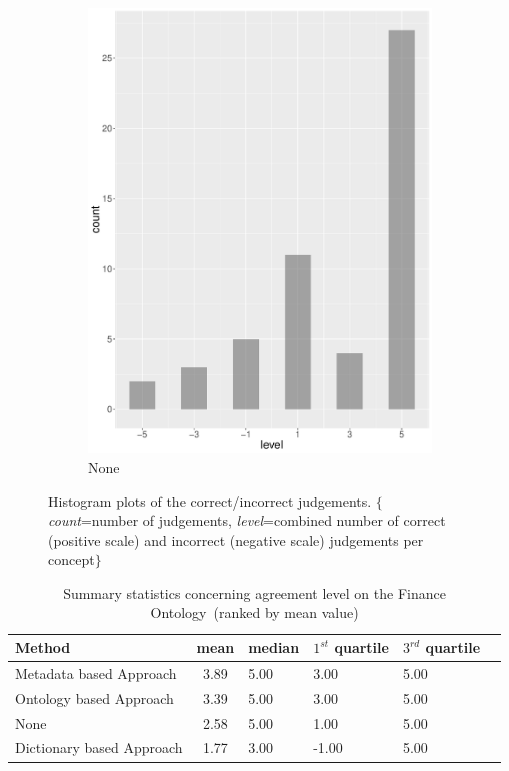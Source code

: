 \begin{figure}
\begin{subfigure}[b]{0.4\textwidth}
        \includegraphics[width=\textwidth]{plots/tennis/hist_level_none}
        \caption{None}
        \label{fig:hist_level_tennis_none}
    \end{subfigure}
    \caption{Histogram plots of the correct/incorrect judgements. $\{$\emph{count}=number of judgements, \emph{level}=combined number of correct (positive scale) and incorrect (negative scale) judgements per concept$\}$ }
	\label{fig:hist_level_tennis_all}
\end{figure}


\begingroup
\renewcommand{\arraystretch}{1.5}
\begin{table}
	\begin{tabularx}{\textwidth}{l c*{4}{Y}}
		\toprule
		Method & mean & median & $1^{st}$ quartile & $3^{rd}$ quartile \\
		\midrule
		 Metadata based Approach & 3.89 & 5.00 & 3.00 & 5.00 \\
		 Ontology based Approach & 3.39 & 5.00 & 3.00 & 5.00 \\
		 None & 2.58 & 5.00 & 1.00 & 5.00 \\
		 Dictionary based Approach & 1.77 & 3.00 & -1.00 & 5.00 \\
		\bottomrule
	\end{tabularx}
	\caption{Summary statistics concerning agreement level on the Finance Ontology~(ranked by mean value)}
	\label{table:level_corr_incorr_tennis}
\end{table}
\endgroup